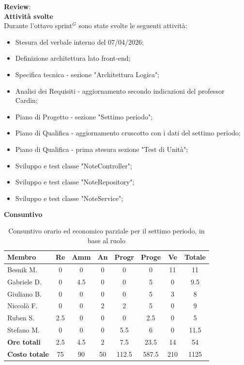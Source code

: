 \documentclass[a4paper,10pt]{article}
\begin{document}
\textbf{Review}: \\
\textbf{Attività svolte}\\
Durante l'ottavo sprint$^G$ sono state svolte le seguenti attività:
\begin{itemize}
  \item Stesura del verbale interno del 07/04/2026;
  \item Definizione architettura lato front-end;
  \item Specifica tecnica - sezione "Architettura Logica";
  \item Analisi dei Requisiti - aggiornamento secondo indicazioni del professor Cardin;
  \item Piano di Progetto - sezione "Settimo periodo";
  \item Piano di Qualifica - aggiornamento cruscotto con i dati del settimo periodo;
  \item Piano di Qualifica - prima stesura sezione "Test di Unità";
  \item Sviluppo e test classe "NoteController";
  \item Sviluppo e test classe "NoteRepository";
  \item Sviluppo e test classe "NoteService";
\end{itemize}
\textbf{Consuntivo}
\begin{table}[H]
\centering
\begin{tabular}{|l|c|c|c|c|c|c|c|}
\hline
\textbf{Membro} & \textbf{Re} & \textbf{Amm} & \textbf{An} & \textbf{Progr} & \textbf{Proge} & \textbf{Ve} & \textbf{Totale} \\
\hline
Besnik M.   & 0   & 0   & 0 & 0   & 0 & 11 & 11 \\
Gabriele D. & 0   & 4.5 & 0 & 0   & 5 & 0  & 9.5 \\
Giuliano B. & 0   & 0   & 0 & 0   & 5 & 3  & 8 \\
Niccolò F.  & 0   & 0   & 2 & 2   & 5 & 0  & 9 \\
Ruben S.    & 2.5 & 0   & 0 & 0   & 2.5 & 0  & 5 \\
Stefano M.  & 0   & 0   & 0 & 5.5 & 6 & 0  & 11.5 \\
\hline
\textbf{Ore totali} & 2.5  & 4.5 & 2 & 7.5  & 23.5  & 14 & 54 \\
\hline
\textbf{Costo totale} & 75  & 90 & 50 & 112.5  & 587.5  & 210 & 1125 \\
\hline
\end{tabular}
\caption{Consuntivo orario ed economico parziale per il settimo periodo, in base al ruolo}
\end{table}
\end{document}
